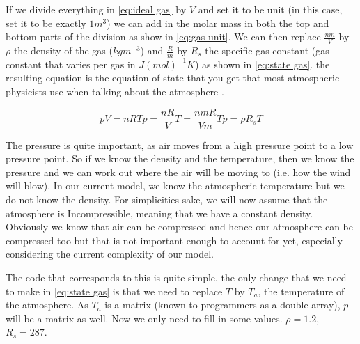 If we divide everything in \autoref{eq:ideal gas} by $V$ and set it to be unit (in this case, set it to be exactly $1 m^3$) we can add in the molar mass in both the top and bottom parts of the 
division as show in \autoref{eq:gas unit}. We can then replace $\frac{nm}{V}$ by $\rho$ the density of the gas ($kgm^{-3}$) and $\frac{R}{m}$ by $R_s$ the specific gas constant (gas constant that varies per 
gas in $J(mol)^{-1}K$) as shown in \autoref{eq:state gas}. the resulting equation is the equation of state that you get that most atmospheric physicists use when talking about the atmosphere \cite{simon}.

\begin{subequations}
    \begin{equation}
        pV = nRT
        \label{eq:ideal gas}
    \end{equation}
    \begin{equation}
        p = \frac{nR}{V}T = \frac{nmR}{Vm}T
        \label{eq:gas unit}
    \end{equation}
    \begin{equation}
        p = \rho R_sT
        \label{eq:state gas}
    \end{equation}
\end{subequations}

The pressure is quite important, as air moves from a high pressure point to a low pressure point. So if we know the density and the temperature, then we know the pressure and we can work out 
where the air will be moving to (i.e. how the wind will blow). In our current model, we know the atmospheric temperature but we do not know the density. For simplicities sake, we will now assume
that the atmosphere is Incompressible, meaning that we have a constant density. Obviously we know that air can be compressed and hence our atmosphere can be compressed too but that is not 
important enough to account for yet, especially considering the current complexity of our model.

The code that corresponds to this is quite simple, the only change that we need to make in \autoref{eq:state gas} is that we need to replace $T$ by $T_a$, the temperature of the atmosphere. As
$T_a$ is a matrix (known to programmers as a double array), $p$ will be a matrix as well. Now we only need to fill in some values. $\rho = 1.2$\cite{densityAir}, $R_s = 287$\cite{specificGasConstantAir}.

